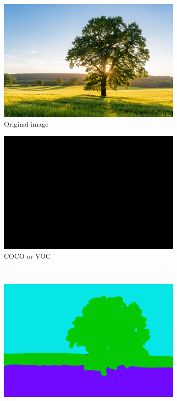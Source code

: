 \documentclass[12pt,a4paper,table,dvipsnames,tikz]{report}
\newcommand{\acronym}{\MakeUppercase}
\begin{document}
	
	\begin{figure}[h!]
		\centering
		\begin{subfigure}[b]{0.3\textwidth}
			\includegraphics[width=\textwidth]{out}
			\caption{Original image}
		\end{subfigure}
		\begin{subfigure}[b]{0.3\textwidth}
			\includegraphics[width=\textwidth]{out_coco_voc}
			\caption{\acronym{coco} or \acronym{voc}}
		\end{subfigure}
		\\
		\begin{subfigure}[b]{0.3\textwidth}
			\includegraphics[width=\textwidth]{out_ade_fcn}

\end{subfigure}
\end{figure}
\end{document}
